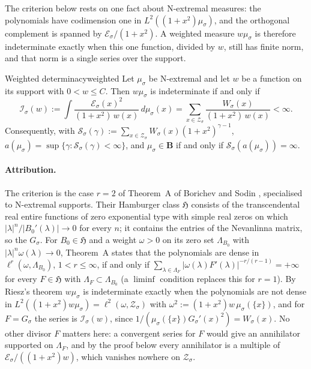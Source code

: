 The criterion below rests on one fact about N-extremal measures: the polynomials have codimension one
in $L^2((1+x^2)\mu_\sigma)$, and the orthogonal complement is spanned by $\mathcal E_\sigma/(1+x^2)$. A
weighted measure $w\mu_\sigma$ is therefore indeterminate exactly when this one function, divided by $w$,
still has finite norm, and that norm is a single series over the support.

\begin{proposition}{Weighted determinacy}{weighted}
Let $\mu_\sigma$ be N-extremal and let $w$ be a function on its support with $0<w\le C$. Then $w\mu_\sigma$
is indeterminate if and only if
\[
  \mathcal I_\sigma(w):=\int\frac{\mathcal E_\sigma(x)^2}{(1+x^2)\,w(x)}\,d\mu_\sigma(x)
  =\sum_{x\in\mathcal Z_\sigma}\frac{W_\sigma(x)}{(1+x^2)\,w(x)}<\infty .
\]
Consequently, with $\mathcal S_\sigma(\gamma):=\sum_{x\in\mathcal Z_\sigma}W_\sigma(x)(1+x^2)^{\gamma-1}$,
$a(\mu_\sigma)=\sup\{\gamma:\mathcal S_\sigma(\gamma)<\infty\}$, and $\mu_\sigma\in\mathbf B$ if and only if
$\mathcal S_\sigma(a(\mu_\sigma))=\infty$.
\end{proposition}

\paragraph{Attribution.} The criterion is the case $r=2$ of Theorem~A of Borichev and Sodin
\cite{BorichevSodin1998}, specialised to N-extremal supports. Their Hamburger class $\mathfrak H$
consists of the transcendental real entire functions of zero exponential type with simple
real zeros on which $|\lambda|^n/|B_0'(\lambda)|\to0$ for every $n$; it contains the entries of the
Nevanlinna matrix, so the $G_\sigma$. For $B_0\in\mathfrak H$ and a weight $\omega>0$ on its zero set
$\Lambda_{B_0}$ with $|\lambda|^n\omega(\lambda)\to0$, Theorem~A states that the polynomials are dense in
$\ell^r(\omega,\Lambda_{B_0})$, $1<r\le\infty$, if and only if
$\sum_{\lambda\in\Lambda_F}|\omega(\lambda)F'(\lambda)|^{-r/(r-1)}=+\infty$ for every $F\in\mathfrak H$ with
$\Lambda_F\subset\Lambda_{B_0}$ (a $\liminf$ condition replaces this for $r=1$). By Riesz's theorem $w\mu_\sigma$
is indeterminate exactly when the polynomials are not dense in
$L^2((1+x^2)w\mu_\sigma)=\ell^2(\omega,\mathcal Z_\sigma)$ with $\omega^2:=(1+x^2)w\,\mu_\sigma(\{x\})$, and for
$F=G_\sigma$ the series is $\mathcal I_\sigma(w)$, since $1/(\mu_\sigma(\{x\})G_\sigma'(x)^2)=W_\sigma(x)$. No other
divisor $F$ matters here: a convergent series for $F$ would give an annihilator supported on
$\Lambda_F$, and by the proof below every annihilator is a multiple of $\mathcal E_\sigma/((1+x^2)w)$, which
vanishes nowhere on $\mathcal Z_\sigma$.

